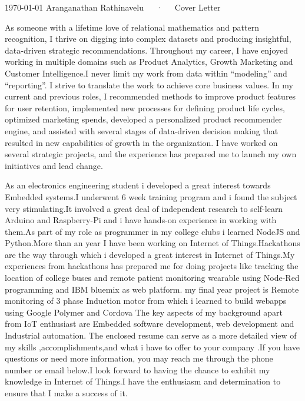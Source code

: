 \documentclass[11pt, a4paper]{awesome-cv}
\begin{document}
\makecvheader[R]
\makecvfooter
  {\today}
  {Aranganathan Rathinavelu~~~·~~~Cover Letter}
  {}
\begin{cvletter}

As someone with a lifetime love of relational mathematics and pattern recognition, I thrive on digging
into complex datasets and producing insightful, data-driven strategic recommendations. Throughout my
career, I have enjoyed working in multiple domains such as Product Analytics, Growth Marketing and
Customer Intelligence.I never limit my work from data within “modeling” and “reporting”. I strive to translate the work to
achieve core business values. In my current and previous roles, I recommended methods to improve
product features for user retention, implemented new processes for defining product life cycles, optimized
marketing spends, developed a personalized product recommender engine, and assisted with several
stages of data-driven decision making that resulted in new capabilities of growth in the organization. I
have worked on several strategic projects, and the experience has prepared me to launch my own
initiatives and lead change.


As an electronics engineering student i developed a great interest towards Embedded systems.I underwent 6 week training program and i found the subject very stimulating.It involved a great deal of independent research to self-learn Arduino and Raspberry-Pi and i have hands-on experience in working with them.As part of my role as programmer in my college clubs i learned NodeJS and Python.More than an year I have been working on Internet of Things.Hackathons are the way through which i developed a great interest in Internet of Things.My experiences from hackathons has prepared me for doing projects like tracking the location of college buses and remote patient monitoring wearable using Node-Red programming and IBM bluemix as web platform.
my final year project is Remote monitoring of 3 phase Induction motor from which i learned to build webapps using Google Polymer and Cordova The key aspects of my background apart from IoT enthusiast are Embedded software development, web development and Industrial automation.
The enclosed resume can serve as a more detailed view of my skills ,accomplishments,and what i have to offer to your company .If you have questions or need more information, you may reach me through the phone number or email below.I look forward to having the chance to ​exhibit my knowledge in Internet of Things​.I have the enthusiasm and determination to ensure that I make a success of it.


\end{cvletter}
\end{document}
